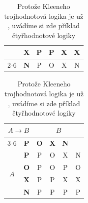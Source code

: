 \documentclass[a4paper, 11pt]{article}
\begin{document}
\begin{table}[h]
\begin{tabular}[p]{|c|c|c|c|c|c|}
                                                          & \textbf{X}               & P          & P          & X          & X \\ \cline{2-6}
                                                          & \textbf{N}               & P          & O          & X          & N \\ \hline
    \end{tabular}
    \begin{tabular}[p]{|c|c|c|c|c|c|}
        \hline
        \multicolumn{2}{|c|}{\multirow{2}{*}{$A \rightarrow B$}} & \multicolumn{4}{c|}{$B$}                                            \\\cline{3-6}
        \multicolumn{2}{| c |}{}                                 & \textbf{P}               & \textbf{O} & \textbf{X} & \textbf{N}     \\ \hline
        \multirow{4}{*}{$A$}                                     & \textbf{P}               & P          & O          & X          & N \\ \cline{2-6}
                                                                 & \textbf{O}               & P          & O          & P          & O \\ \cline{2-6}
                                                                 & \textbf{X}               & P          & P          & X          & X \\ \cline{2-6}
                                                                 & \textbf{N}               & P          & P          & P          & P \\ \hline
    \end{tabular}
    \caption{Protože Kleeneho trojhodnotová logika je už , uvádíme si zde příklad čtyřhodnotové logiky}
    \label{tab:Kleen}
\end{table}
\end{document}
